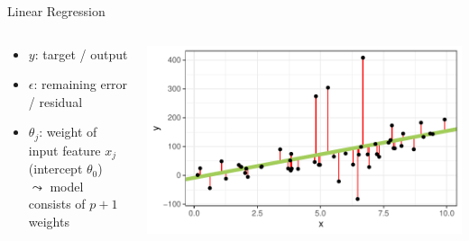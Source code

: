 \documentclass[11pt,compress,t,notes=noshow, aspectratio=169, xcolor=table]{beamer}
\begin{document}
\begin{frame}[c]{Linear Regression}
\begin{columns}[T, totalwidth = \linewidth]
\begin{column}{0.58\linewidth}
 \begin{itemize}
        \item $y$: target / output
        \item $\epsilon$: remaining error / residual %
        \item $\theta_j$: weight of input feature $x_j$ (intercept $\theta_0$)\\
        $\leadsto$ model consists of $p+1$ weights
    \end{itemize}
\end{column}
\begin{column}{0.42\linewidth}
\includegraphics[width=\linewidth]{figure/lm_example.pdf}
\end{column}
\end{columns}
   

\end{frame}
\end{document}
